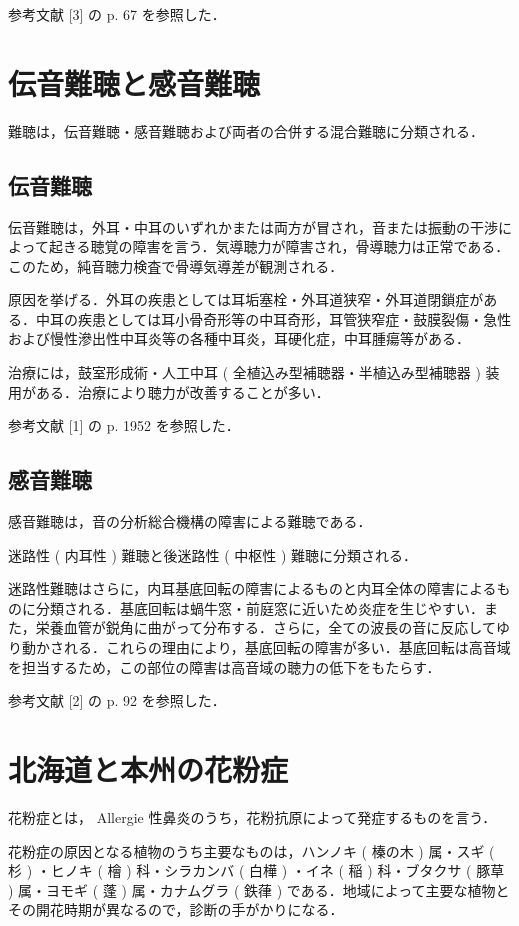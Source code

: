 \documentclass[10pt,uplatex]{jsarticle}
\begin{document}
参考文献 [3] の p. 67 を参照した．

\section{伝音難聴と感音難聴}

難聴は，伝音難聴・感音難聴および両者の合併する混合難聴に分類される．

\subsection{伝音難聴}

伝音難聴は，外耳・中耳のいずれかまたは両方が冒され，音または振動の干渉によって起きる聴覚の障害を言う．気導聴力が障害され，骨導聴力は正常である．このため，純音聴力検査で骨導気導差が観測される．

原因を挙げる．外耳の疾患としては耳垢塞栓・外耳道狭窄・外耳道閉鎖症がある．中耳の疾患としては耳小骨奇形等の中耳奇形，耳管狭窄症・鼓膜裂傷・急性および慢性滲出性中耳炎等の各種中耳炎，耳硬化症，中耳腫瘍等がある．

治療には，鼓室形成術・人工中耳 ( 全植込み型補聴器・半植込み型補聴器 ) 装用がある．治療により聴力が改善することが多い．

参考文献 [1] の p. 1952 を参照した．

\subsection{感音難聴}

感音難聴は，音の分析総合機構の障害による難聴である．

迷路性 ( 内耳性 ) 難聴と後迷路性 ( 中枢性 ) 難聴に分類される．

迷路性難聴はさらに，内耳基底回転の障害によるものと内耳全体の障害によるものに分類される．基底回転は蝸牛窓・前庭窓に近いため炎症を生じやすい．また，栄養血管が鋭角に曲がって分布する．さらに，全ての波長の音に反応してゆり動かされる．これらの理由により，基底回転の障害が多い．基底回転は高音域を担当するため，この部位の障害は高音域の聴力の低下をもたらす．

参考文献 [2] の p. 92 を参照した．

\section{北海道と本州の花粉症}

花粉症とは， Allergie 性鼻炎のうち，花粉抗原によって発症するものを言う．

花粉症の原因となる植物のうち主要なものは，ハンノキ ( 榛の木 ) 属・スギ ( 杉 ) ・ヒノキ ( 檜 ) 科・シラカンバ ( 白樺 ) ・イネ ( 稲 ) 科・ブタクサ ( 豚草 ) 属・ヨモギ ( 蓬 ) 属・カナムグラ ( 鉄葎 ) である．地域によって主要な植物とその開花時期が異なるので，診断の手がかりになる．
\end{document}
